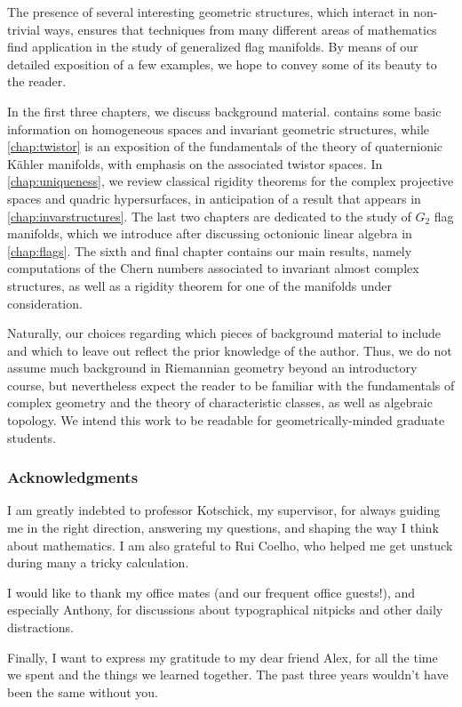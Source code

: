 The presence of several interesting geometric structures, which interact in non-trivial ways, ensures that techniques from many different areas of mathematics find application in the study of generalized flag manifolds. By means of our detailed exposition of a few examples, we hope to convey some of its beauty to the reader.

In the first three chapters, we discuss background material.  contains some basic information on homogeneous spaces and invariant geometric structures, while \cref{chap:twistor} is an exposition of the fundamentals of the theory of quaternionic K\"ahler manifolds, with emphasis on the associated twistor spaces. In \cref{chap:uniqueness}, we review classical rigidity theorems for the complex projective spaces and quadric hypersurfaces, in anticipation of a result that appears in \cref{chap:invarstructures}. The last two chapters are dedicated to the study of $G_2$ flag manifolds, which we introduce after discussing octonionic linear algebra in \cref{chap:flags}. The sixth and final chapter contains our main results, namely computations of the Chern numbers associated to invariant almost complex structures, as well as a rigidity theorem for one of the manifolds under consideration. 

Naturally, our choices regarding which pieces of background material to include and which to leave out reflect the prior knowledge of the author. Thus, we do not assume much background in Riemannian geometry beyond an introductory course, but nevertheless expect the reader to be familiar with the fundamentals of complex geometry and the theory of characteristic classes, as well as algebraic topology. We intend this work to be readable for geometrically-minded graduate students. 

\subsubsection{Acknowledgments}

I am greatly indebted to professor Kotschick, my supervisor, for always guiding me in the right direction, answering my questions, and shaping the way I think about mathematics. I am also grateful to Rui Coelho, who helped me get unstuck during many a tricky calculation.

I would like to thank my office mates (and our frequent office guests!), and especially Anthony, for discussions about typographical nitpicks and other daily distractions.

Finally, I want to express my gratitude to my dear friend Alex, for all the time we spent and the things we learned together. The past three years wouldn't have been the same without you.